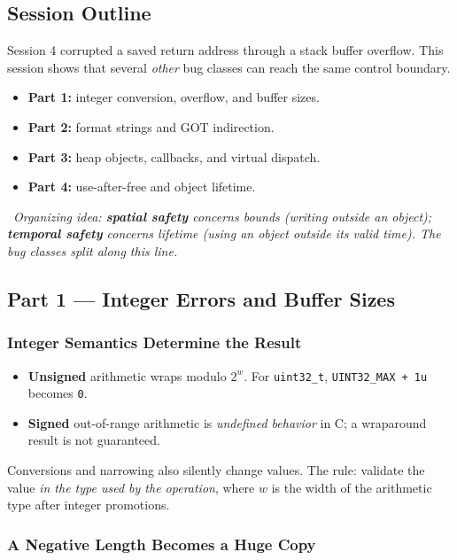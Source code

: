 \documentclass[hidelinks]{article}
\newcommand{\callout}[1]{\par\smallskip\noindent{\color{capri}$\blacktriangleright$}\ \textit{#1}\par\smallskip}
\begin{document}
\subsection{Session Outline}

Session 4 corrupted a saved return address through a stack buffer overflow. This session shows that several \emph{other} bug classes can reach the same control boundary.
\begin{itemize}
    \item \textbf{Part 1:} integer conversion, overflow, and buffer sizes.
    \item \textbf{Part 2:} format strings and GOT indirection.
    \item \textbf{Part 3:} heap objects, callbacks, and virtual dispatch.
    \item \textbf{Part 4:} use-after-free and object lifetime.
\end{itemize}

\callout{Organizing idea: \textbf{spatial safety} concerns \emph{bounds} (writing outside an object); \textbf{temporal safety} concerns \emph{lifetime} (using an object outside its valid time). The bug classes split along this line.}

\subsection{Part 1 --- Integer Errors and Buffer Sizes}

\subsubsection{Integer Semantics Determine the Result}

\begin{itemize}
    \item \textbf{Unsigned} arithmetic wraps modulo $2^w$. For \texttt{uint32\_t}, \texttt{UINT32\_MAX + 1u} becomes \texttt{0}.
    \item \textbf{Signed} out-of-range arithmetic is \emph{undefined behavior} in C; a wraparound result is not guaranteed.
\end{itemize}
Conversions and narrowing also silently change values. The rule: validate the value \emph{in the type used by the operation}, where $w$ is the width of the arithmetic type after integer promotions.

\subsubsection{A Negative Length Becomes a Huge Copy}
\end{document}
